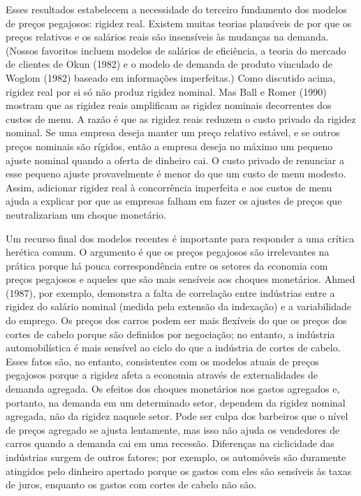 \documentclass[12pt]{article}
\begin{document}
Esses resultados estabelecem a necessidade do terceiro fundamento dos modelos de preços pegajosos: rigidez real. Existem muitas teorias plausíveis de por que os preços relativos e os salários reais são insensíveis às mudanças na demanda. (Nossos favoritos incluem modelos de salários de eficiência, a teoria do mercado de clientes de Okun (1982) e o modelo de demanda de produto vinculado de Woglom (1982) baseado em informações imperfeitas.) Como discutido acima, rigidez real por si só não produz rigidez nominal. Mas Ball e Romer (1990) mostram que as rigidez reais amplificam as rigidez nominais decorrentes dos custos de menu. A razão é que as rigidez reais reduzem o custo privado da rigidez nominal. Se uma empresa deseja manter um preço relativo estável, e se outros preços nominais são rígidos, então a empresa deseja no máximo um pequeno ajuste nominal quando a oferta de dinheiro cai. O custo privado de renunciar a esse pequeno ajuste provavelmente é menor do que um custo de menu modesto. Assim, adicionar rigidez real à concorrência imperfeita e aos custos de menu ajuda a explicar por que as empresas falham em fazer os ajustes de preços que neutralizariam um choque monetário.

Um recurso final dos modelos recentes é importante para responder a uma crítica herética comum. O argumento é que os preços pegajosos são irrelevantes na prática porque há pouca correspondência entre os setores da economia com preços pegajosos e aqueles que são mais sensíveis aos choques monetários. Ahmed (1987), por exemplo, demonstra a falta de correlação entre indústrias entre a rigidez do salário nominal (medida pela extensão da indexação) e a variabilidade do emprego. Os preços dos carros podem ser mais flexíveis do que os preços dos cortes de cabelo porque são definidos por negociação; no entanto, a indústria automobilística é mais sensível ao ciclo do que a indústria de cortes de cabelo. Esses fatos são, no entanto, consistentes com os modelos atuais de preços pegajosos porque a rigidez afeta a economia através de externalidades de demanda agregada. Os efeitos dos choques monetários nos gastos agregados e, portanto, na demanda em um determinado setor, dependem da rigidez nominal agregada, não da rigidez naquele setor. Pode ser culpa dos barbeiros que o nível de preços agregado se ajusta lentamente, mas isso não ajuda os vendedores de carros quando a demanda cai em uma recessão. Diferenças na ciclicidade das indústrias surgem de outros fatores; por exemplo, os automóveis são duramente atingidos pelo dinheiro apertado porque os gastos com eles são sensíveis às taxas de juros, enquanto os gastos com cortes de cabelo não são.
\end{document}
